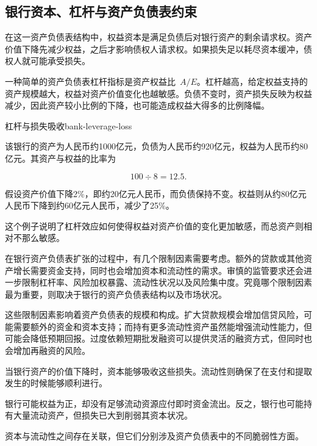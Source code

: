\subsection{银行资本、杠杆与资产负债表约束}

在这一资产负债表结构中，权益资本是满足负债后对银行资产的剩余请求权。资产价值下降先减少权益，之后才影响债权人请求权。如果损失足以耗尽资本缓冲，债权人就可能承受损失。

一种简单的资产负债表杠杆指标是资产权益比~$A/E$。杠杆越高，给定权益支持的资产规模越大，权益对资产价值变化也越敏感。负债不变时，资产损失反映为权益减少，因此资产较小比例的下降，也可能造成权益大得多的比例降幅。

\begin{example}{杠杆与损失吸收}{bank-leverage-loss}

该银行的资产为人民币约1000亿元，负债为人民币约920亿元，权益为人民币约80亿元。其资产与权益的比率为

\[
100\div 8=12.5.
\]

假设资产价值下降2\%，即约20亿元人民币，而负债保持不变。权益则从约80亿元人民币下降到约60亿元人民币，减少了25\%。

这个例子说明了杠杆效应如何使得权益对资产价值的变化更加敏感，而总资产则相对不那么敏感。

\end{example}

在银行资产负债表扩张的过程中，有几个限制因素需要考虑。额外的贷款或其他资产增长需要资金支持，同时也会增加资本和流动性的需求。审慎的监管要求还会进一步限制杠杆率、风险加权暴露、流动性状况以及风险集中度。究竟哪个限制因素最为重要，则取决于银行的资产负债表结构以及市场状况。

这些限制因素影响着资产负债表的规模和构成。扩大贷款规模会增加信贷风险，可能需要额外的资金和资本支持；而持有更多流动性资产虽然能增强流动性能力，但可能会降低预期回报。过度依赖短期批发融资可以提供灵活的融资方式，但同时也会增加再融资的风险。

\begin{tcolorbox}[
  enhanced,
  breakable,
  colback=white,
  colframe=FinanceBlue,
  boxrule=0.7pt,
  sharp corners,
  borderline west={2.2pt}{0pt}{FinanceBlue},
  title=\textbf{财务展望：资本与流动性发挥着不同的作用},
  coltitle=white,
  colbacktitle=FinanceBlue,
  fonttitle=\bfseries,
  before skip=1.2em,
  after skip=1.2em
]

当银行资产的价值下降时，资本能够吸收这些损失。流动性则确保了在支付和提取发生的时候能够顺利进行。

银行可能权益为正，却没有足够流动资源应付即时资金流出。反之，银行也可能持有大量流动资产，但损失已大到削弱其资本状况。

资本与流动性之间存在关联，但它们分别涉及资产负债表中的不同脆弱性方面。

\end{tcolorbox}



